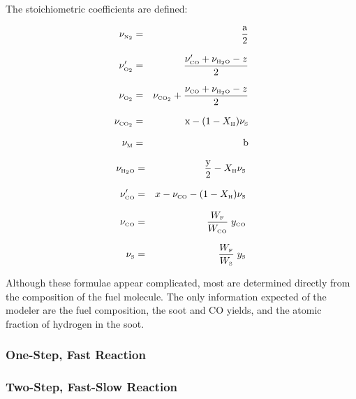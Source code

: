 The stoichiometric coefficients are defined:

\parbox{2.5in}{
\begin{eqnarray*} \nu_{\tiny \hbox{N}_2}  &=& \frac{\hbox{a}}{2}\\*[.1in]
                  \nu_{\tiny \hbox{O}_2}' &=& \frac{\nu_{\tiny \hbox{CO}}'+\nu_{\tiny \hbox{H}_2\hbox{O}}-z}{2}\\*[.1in]
                  \nu_{\tiny \hbox{O}_2}  &=& \nu_{\tiny \hbox{CO}_2} + \frac{\nu_{\tiny \hbox{CO}}+\nu_{\tiny \hbox{H}_2\hbox{O}}-z}{2}\\*[.1in]
                  \nu_{\tiny \hbox{CO}_2} &=& \hbox{x} - (1-X_{\tiny \hbox{H}}) \nu_{\tiny \hbox{S}} \\*[.1in]
                  \nu_{\tiny \hbox{M}}     &=& \hbox{b} \end{eqnarray*} }
\hfill \parbox{3.5in}{\begin{eqnarray}
                  \nu_{\tiny \hbox{H}_2\hbox{O}} &=& \frac{\hbox{y}}{2}- X_{\tiny \hbox{H}} \nu_{\tiny \hbox{S}}\\*[.1in]
                  \nu_{\tiny \hbox{CO}}'   &=& x - \nu_{\tiny \hbox{CO}} - (1-X_{\tiny \hbox{H}}) \nu_{\tiny \hbox{S}} \\*[.1in]
                  \nu_{\tiny \hbox{CO}}    &=& \frac{W_{\tiny \hbox{F}}}{W_{\tiny \hbox{CO}}} \; y_{\tiny \hbox{CO}} \\*[.1in]
                  \nu_{\tiny \hbox{S}}    &=& \frac{W_{\tiny \hbox{F}}}{W_{\tiny \hbox{S}}} \; y_{\tiny \hbox{S}}
\end{eqnarray} }
Although these formulae appear complicated, most are determined directly from the composition of the fuel molecule. The only information
expected of the modeler are the fuel composition, the soot and CO yields, and the atomic fraction of hydrogen in the soot.


\subsubsection{One-Step, Fast Reaction}





\subsubsection{Two-Step, Fast-Slow Reaction}

